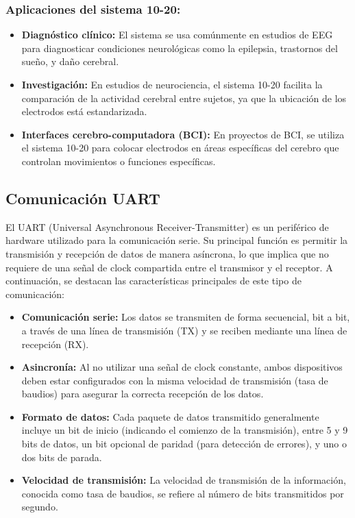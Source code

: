\documentclass{article}
\begin{document}
\subsubsection{Aplicaciones del sistema 10-20:}
\begin{itemize}
    \item \textbf{Diagnóstico clínico:} El sistema se usa comúnmente en estudios de EEG para diagnosticar condiciones neurológicas como la epilepsia, trastornos del sueño, y daño cerebral.
    \item \textbf{Investigación:} En estudios de neurociencia, el sistema 10-20 facilita la comparación de la actividad cerebral entre sujetos, ya que la ubicación de los electrodos está estandarizada.
    \item \textbf{Interfaces cerebro-computadora (BCI):} En proyectos de BCI, se utiliza el sistema 10-20 para colocar electrodos en áreas específicas del cerebro que controlan movimientos o funciones específicas.
\end{itemize}


\subsection{Comunicación UART}

El UART (Universal Asynchronous Receiver-Transmitter) es un periférico de hardware utilizado para la comunicación serie. Su principal función es permitir la transmisión y recepción de datos de manera asíncrona, lo que implica que no requiere de una señal de clock compartida entre el transmisor y el receptor. A continuación, se destacan las características principales de este tipo de comunicación:

\begin{itemize}
    \item \textbf{Comunicación serie:} Los datos se transmiten de forma secuencial, bit a bit, a través de una línea de transmisión (TX) y se reciben mediante una línea de recepción (RX).
    \item \textbf{Asincronía:} Al no utilizar una señal de clock constante, ambos dispositivos deben estar configurados con la misma velocidad de transmisión (tasa de baudios) para asegurar la correcta recepción de los datos.
    \item \textbf{Formato de datos:} Cada paquete de datos transmitido generalmente incluye un bit de inicio (indicando el comienzo de la transmisión), entre 5 y 9 bits de datos, un bit opcional de paridad (para detección de errores), y uno o dos bits de parada.
    \item \textbf{Velocidad de transmisión:} La velocidad de transmisión de la información, conocida como tasa de baudios, se refiere al número de bits transmitidos por segundo.
\end{itemize}
\end{document}
